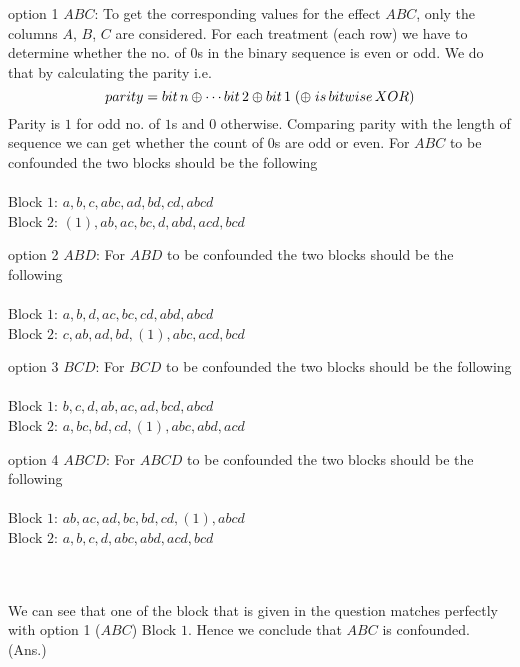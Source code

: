 \documentclass{article}
\theoremstyle{remark}
\begin{document}
\begin{paragraph}{option 1 $ABC$: }
    To get the corresponding values for the effect $ABC$, only the columns $A$, $B$, $C$ are considered. For each treatment (each row) we have to determine whether the no. of $0$s in the binary sequence is even or odd. We do that by calculating the parity i.e. \\
    \[
    parity= bit\,n \oplus \cdots bit\,2 \oplus bit\,1 \;(\oplus \; is\,bitwise\, XOR)\\
    \]
    Parity is $1$ for odd no. of $1$s and $0$ otherwise. Comparing parity with the length of sequence we can 
    get whether the count of 0s are odd or even.
\newline
For $ABC$ to be confounded the two blocks should be the following\\ \\
Block $1$: $a,b,c,abc,ad,bd,cd,abcd$\\
Block $2$: $(1),ab,ac,bc,d,abd,acd,bcd$
\end{paragraph}
\begin{paragraph}{option 2 $ABD$: }
    For $ABD$ to be confounded the two blocks should be the following\\ \\    
    Block $1$: $a,b,d,ac,bc,cd,abd,abcd$ \\
    Block $2$: $c,ab,ad,bd,(1),abc,acd,bcd$ \\
\end{paragraph}

\begin{paragraph}{option 3 $BCD$: }
    For $BCD$ to be confounded the two blocks should be the following\\ \\    
    Block $1$: $b,c,d,ab,ac,ad,bcd,abcd$ \\
    Block $2$: $a,bc,bd,cd,(1),abc,abd,acd$ \\
\end{paragraph}

\begin{paragraph}{option 4 $ABCD$: }
    For $ABCD$ to be confounded the two blocks should be the following\\ \\    
    Block $1$: $ab,ac,ad,bc,bd,cd,(1),abcd$ \\
    Block $2$: $a,b,c,d,abc,abd,acd,bcd$ \\
\end{paragraph}
\\
\\
We can see that one of the block that is given in the question matches perfectly with option 1 ($ABC$) Block $1$. Hence we conclude that $ABC$ is confounded. (Ans.)
\end{document}
